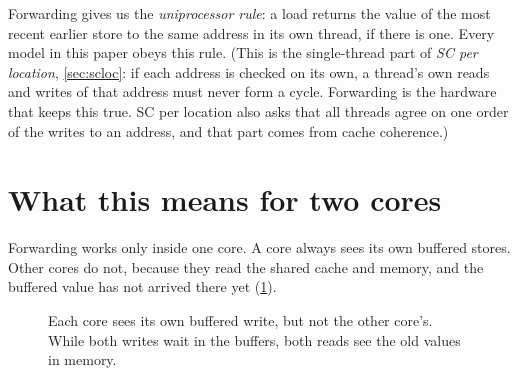 Forwarding gives us the \emph{uniprocessor rule}: a load returns the value of the most recent earlier store to the same address in its own thread, if there is one. Every model in this paper obeys this rule. (This is the single-thread part of \emph{SC per location}, \cref{sec:scloc}: if each address is checked on its own, a thread's own reads and writes of that address must never form a cycle. Forwarding is the hardware that keeps this true. SC per location also asks that all threads agree on one order of the writes to an address, and that part comes from cache coherence.)

\section{What this means for two cores}
\label{sec:twocores}

Forwarding works only inside one core. A core always sees its own buffered stores. Other cores do not, because they read the shared cache and memory, and the buffered value has not arrived there yet (\cref{fig:twocores}).

\begin{figure}[!htbp]
\centering
{}
\caption{Each core sees its own buffered write, but not the other core's. While both writes wait in the buffers, both reads see the old values in memory.}
\label{fig:twocores}
\end{figure}

